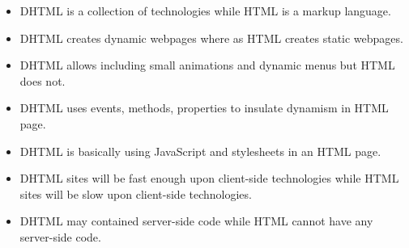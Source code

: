 \documentclass[a4paper]{article}
\begin{document}
  \begin{itemize}
    \item DHTML is a collection of technologies while HTML is a markup
      language.
    \item DHTML creates dynamic webpages where as HTML creates static
      webpages.
    \item DHTML allows including small animations and dynamic menus
      but HTML does not.
    \item DHTML uses events, methods, properties to insulate dynamism in 
      HTML page.
    \item DHTML is basically using JavaScript and stylesheets in an HTML
      page.
    \item DHTML sites will be fast enough upon client-side technologies
      while HTML sites will be slow upon client-side technologies.
    \item DHTML may contained server-side code while HTML cannot have any
      server-side code.
  \end{itemize}%
\end{document}
